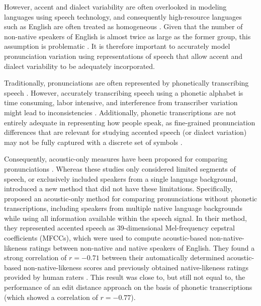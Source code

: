 \documentclass[11pt,a4paper]{article}
\begin{document}
However, accent and dialect variability are often overlooked in modeling languages using speech technology, and consequently high-resource languages such as English are often treated as homogeneous \citep{blodgett2016demographic}.
Given that the number of non-native speakers of English is almost twice as large as the former group, this assumption is problematic  \citep{viglino2019end}. 
It is therefore important to accurately model pronunciation variation using representations of speech that allow accent and dialect variability to be adequately incorporated.

Traditionally, pronunciations are often represented by phonetically transcribing speech \citep{nerbonne1997measuring, livescu2000lexical, gooskens2004perceptive, heeringa2004measuring, wieling2014a, chen2016large, jeszenszky2017exploring}.
However, accurately transcribing speech using a phonetic alphabet is time consuming, labor intensive, and interference from transcriber variation might lead to inconsistencies \citep{hakkani2002active, bucholtz2007variation, novotney2010cheap}.
Additionally, phonetic transcriptions are not entirely adequate in representing how people speak, as fine-grained pronunciation differences that are relevant for studying accented speech (or dialect variation) may not be fully captured with a discrete set of symbols \citep{mermelstein1976distance, duckworth1990extensions, cucchiarini1996assessing, liberman2018}.

Consequently, acoustic-only measures have been proposed for comparing pronunciations \citep{Huckvale2007, Ferragne2010, Strycharczuk2020}. Whereas these studies only considered limited segments of speech, or exclusively included speakers from a single language background, \citet{acoustic-measure} introduced a new method that did not have these limitations. Specifically, \citet{acoustic-measure} proposed an acoustic-only method for comparing pronunciations without phonetic transcriptions, including speakers from multiple native language backgrounds while using all information available within the speech signal.
In their method, they represented accented speech as 39-dimensional Mel-frequency cepstral coefficients (MFCCs), which were used to compute acoustic-based non-native-likeness ratings between non-native and native speakers of English. 
They found a strong correlation of $r = -0.71$ between their automatically determined acoustic-based non-native-likeness scores and previously obtained native-likeness ratings provided by human raters \citep{wieling2014a}. 
This result was close to, but still not equal to, the performance of an edit distance approach on the basis of phonetic transcriptions (which showed a correlation of $r = -0.77$).
\end{document}
